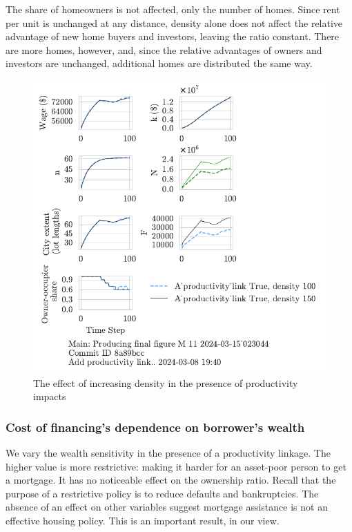 The share of homeowners is not affected, only the number of homes. Since rent per unit is unchanged at any distance, density alone does not affect the relative advantage of new home buyers and investors, leaving the ratio constant. There are more homes, however, and, since the relative advantages of owners and investors are unchanged, additional homes are distributed the same way.  



\begin{figure}[h!bt]
    \centering
    \includegraphics[scale=.8, trim={0 1.4cm 0 0},clip]{fig/With-productivity_link-density-023044.pdf}
    \caption{The effect of increasing density in the presence of productivity impacts}
    \label{fig:Productivity_link_and_density_ownership_trajectory}
\end{figure}


\newpage

\subsubsection{Cost of financing's dependence on borrower's wealth}
We vary the wealth sensitivity in the presence of a productivity linkage. The higher value is more restrictive:  making it harder for an asset-poor person to get a mortgage. It has no noticeable effect on the ownership ratio. Recall that the purpose of a restrictive policy is to reduce defaults and bankruptcies. The absence of an effect on other variables suggest mortgage assistance is not an effective housing policy.  This is an important result, in our view.

